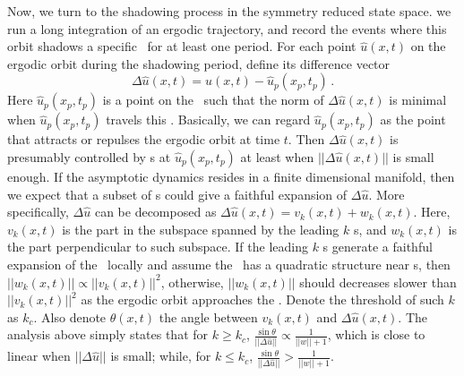 \documentclass[prl,aps,preprint,showpacs]{revtex4-1} %
\begin{document}
Now, we turn to the shadowing process in the symmetry reduced state space.
we run a long integration of an ergodic trajectory,
and record the events where this orbit shadows a specific \po\ for at
least one period. For each point $\hat{u}(x, t)$
on the ergodic orbit during the shadowing period,
define its difference vector
\begin{equation}
  \label{eq:dif}
  \Delta \hat{u}(x,t) = \hat{u}(x, t) -\hat{u}_p(x_p, t_p)
  \,.
\end{equation}
Here $\hat{u}_p(x_p, t_p)$ is a point on the \po\ such that the norm
of $\Delta \hat{u}(x,t)$ is minimal when $\hat{u}_p(x_p, t_p)$
travels this \po. Basically, we can regard
$\hat{u}_p(x_p, t_p)$ as the point that attracts or repulses the ergodic
orbit at time $t$. Then $\Delta \hat{u}(x,t)$ is presumably
controlled by \Fv s at  $\hat{u}_p(x_p, t_p)$ at least when
$||\Delta \hat{u}(x,t)||$ is small enough.
If the asymptotic dynamics resides in a finite dimensional manifold,
then we expect that a subset of \Fv s could give a faithful
expansion of $\Delta \hat{u}$. More specifically,
$\Delta \hat{u}$ can be decomposed as
$\Delta \hat{u}(x, t) = v_k(x, t) + w_k(x,t)$.
Here, $v_k(x, t)$ is the part in the subspace spanned by the
leading $k$ \Fv s, and $w_k(x,t)$ is the part perpendicular to
such subspace. If the leading $k$ \Fv s generate a faithful
expansion of the \inm\ locally and assume the \inm\  has
a quadratic structure near \po s, then
$||w_k(x, t)|| \propto ||v_k(x,t)||^2$, otherwise,
$||w_k(x, t)||$ should decreases
slower than $||v_k(x,t)||^2$ as the ergodic orbit approaches the
\po. Denote the threshold of such $k$ as $k_c$.
Also denote  $\theta(x,t)$ the angle
between $v_k(x, t)$ and $\Delta \hat{u}(x, t)$. The analysis
above simply states that for $k \ge k_c$,
$\frac{\sin\theta}{||\Delta \hat{u}||} \propto \frac{1}{||w||+1}$,
which
is close to linear when $||\Delta \hat{u}||$ is small; while,
for $k \le k_c$,
$\frac{\sin\theta}{||\Delta \hat{u}||} > \frac{1}{||w||+1}$.
\end{document}
